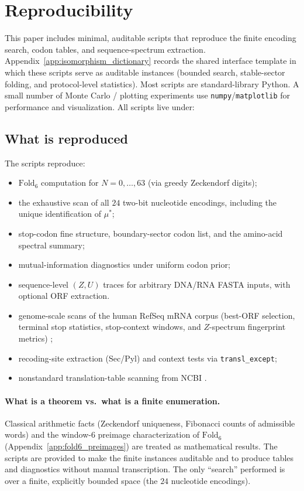 \section{Reproducibility}
\label{app:reproducibility}

This paper includes minimal, auditable scripts that reproduce the finite encoding search, codon tables, and sequence-spectrum extraction.
Appendix~\ref{app:isomorphism_dictionary} records the shared interface template in which these scripts serve as auditable instances (bounded search, stable-sector folding, and protocol-level statistics).
Most scripts are standard-library Python. A small number of Monte Carlo / plotting experiments use \texttt{numpy}/\texttt{matplotlib} for performance and visualization.
All scripts live under:
\begin{center}
\end{center}

\subsection{What is reproduced}
The scripts reproduce:
\begin{itemize}
\item $\mathrm{Fold}_6$ computation for $N=0,\dots,63$ (via greedy Zeckendorf digits);
\item the exhaustive scan of all $24$ two-bit nucleotide encodings, including the unique identification of $\mu^\ast$;
\item stop-codon fine structure, boundary-sector codon list, and the amino-acid spectral summary;
\item mutual-information diagnostics under uniform codon prior;
\item sequence-level $(Z,U)$ traces for arbitrary DNA/RNA FASTA inputs, with optional ORF extraction.
\item genome-scale scans of the human RefSeq mRNA corpus (best-ORF selection, terminal stop statistics, stop-context windows, and $Z$-spectrum fingerprint metrics) \cite{NCBIRefSeq};
\item recoding-site extraction (Sec/Pyl) and context tests via \texttt{transl\_}\allowbreak\texttt{except};
\item nonstandard translation-table scanning from NCBI  \cite{NCBIGCPRT,NCBIGeneticCodes}.
\end{itemize}

\paragraph{What is a theorem vs.\ what is a finite enumeration.}
Classical arithmetic facts (Zeckendorf uniqueness, Fibonacci counts of admissible words) and the window-$6$ preimage characterization of $\mathrm{Fold}_6$ (Appendix~\ref{app:fold6_preimages}) are treated as mathematical results.
The scripts are provided to make the finite instances auditable and to produce tables and diagnostics without manual transcription.
The only ``search'' performed is over a finite, explicitly bounded space (the $24$ nucleotide encodings).


